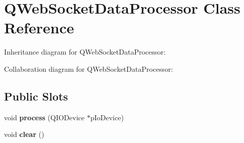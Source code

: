 \hypertarget{class_q_web_socket_data_processor}{}\section{Q\+Web\+Socket\+Data\+Processor Class Reference}
\label{class_q_web_socket_data_processor}


Inheritance diagram for Q\+Web\+Socket\+Data\+Processor\+:


Collaboration diagram for Q\+Web\+Socket\+Data\+Processor\+:
\subsection*{Public Slots}
\begin{DoxyCompactItemize}
\item 
\mbox{\label{class_q_web_socket_data_processor_a27b07eb0195b640cbe682763280f0e0f}} 
void {\bfseries process} (Q\+I\+O\+Device $\ast$p\+Io\+Device)
\item 
\mbox{\label{class_q_web_socket_data_processor_af6ef6143ecd4a3b12ad722820448ded3}} 
void {\bfseries clear} ()
\end{DoxyCompactItemize}

